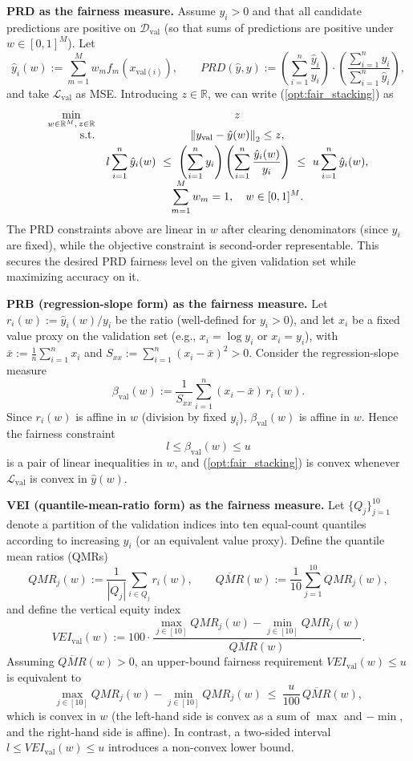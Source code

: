 \documentclass[11pt]{article}
\theoremstyle{plain}
\theoremstyle{definition}
\newcommand{\R}{\mathbb{R}}
\newcommand{\1}{\mathbf{1}}
\newcommand{\D}{\mathcal{D}}
\renewcommand{\L}{\mathcal{L}}
\renewcommand{\R}{\mathbb{R}}
\begin{document}
{\medskip
\noindent \textbf{PRD as the fairness measure.}
Assume $y_i>0$ and that all candidate predictions are positive on $\D_{\mathrm{val}}$ (so that sums of predictions are positive under $w\in[0,1]^M$). Let
\[
\hat y_i(w):=\sum_{m=1}^M w_m f_m(x_{\mathrm{val}(i)}),
\qquad
PRD(\hat y,y):=\left(\sum_{i=1}^n \frac{\hat y_i}{y_i} \right)\cdot\left(\frac{\sum_{i=1}^n y_i}{\sum_{i=1}^n \hat y_i}\right),
\]
and take $\L_{\mathrm{val}}$ as MSE. Introducing $z\in\R$, we can write (\ref{opt:fair_stacking}) as
\[
\everymath{\displaystyle}
\begin{array}{rcl}
\min\limits_{w\in\R^M,\, z\in\R} & z\\
\text{s.t.} & \left\|y_{\mathrm{val}}-\hat y(w)\right\|_2 \le z,\\[1mm]
& l \sum_{i=1}^n \hat y_i(w)\ \le\ \left(\sum_{i=1}^n y_i\right)\left(\sum_{i=1}^n \frac{\hat y_i(w)}{y_i}\right)\ \le\ u \sum_{i=1}^n \hat y_i(w),\\
& \sum_{m=1}^M w_m =1,\quad w\in[0,1]^M.
\end{array}
\]
The PRD constraints above are linear in $w$ after clearing denominators (since $y_i$ are fixed), while the objective constraint is second-order representable. This secures the desired PRD fairness level on the given validation set while maximizing accuracy on it.

\medskip
\noindent \textbf{PRB (regression-slope form) as the fairness measure.}
Let $r_i(w):=\hat y_i(w)/y_i$ be the ratio (well-defined for $y_i>0$), and let $x_i$ be a fixed value proxy on the validation set (e.g., $x_i=\log y_i$ or $x_i=y_i$), with $\bar x := \frac{1}{n}\sum_{i=1}^n x_i$ and $S_{xx}:=\sum_{i=1}^n (x_i-\bar x)^2>0$. Consider the regression-slope measure
\[
\beta_{\mathrm{val}}(w):=\frac{1}{S_{xx}} \sum_{i=1}^n (x_i-\bar x)\, r_i(w).
\]
Since $r_i(w)$ is affine in $w$ (division by fixed $y_i$), $\beta_{\mathrm{val}}(w)$ is affine in $w$. Hence the fairness constraint
\[
l \le \beta_{\mathrm{val}}(w) \le u
\]
is a pair of linear inequalities in $w$, and (\ref{opt:fair_stacking}) is convex whenever $\L_{\mathrm{val}}$ is convex in $\hat y(w)$.

\medskip
\noindent \textbf{VEI (quantile-mean-ratio form) as the fairness measure.}
    Let $\{Q_j\}_{j=1}^{10}$ denote a partition of the validation indices into ten equal-count quantiles according to increasing $y_i$ (or an equivalent value proxy). Define the quantile mean ratios (QMRs)
\[
QMR_j(w):=\frac{1}{|Q_j|}\sum_{i\in Q_j} r_i(w),
\qquad
\overline{QMR}(w):=\frac{1}{10}\sum_{j=1}^{10} QMR_j(w),
\]
and define the vertical equity index
\[
VEI_{\mathrm{val}}(w):=100\cdot \frac{\max_{j\in[10]} QMR_j(w)-\min_{j\in[10]} QMR_j(w)}{\overline{QMR}(w)}.
\]
Assuming $\overline{QMR}(w)>0$, an upper-bound fairness requirement $VEI_{\mathrm{val}}(w)\le u$ is equivalent to
\[
\max_{j\in[10]} QMR_j(w)-\min_{j\in[10]} QMR_j(w)\ \le\ \frac{u}{100}\,\overline{QMR}(w),
\]
which is convex in $w$ (the left-hand side is convex as a sum of $\max$ and $-\min$, and the right-hand side is affine). In contrast, a two-sided interval $l\le VEI_{\mathrm{val}}(w)\le u$ introduces a non-convex lower bound.

}
\end{document}

